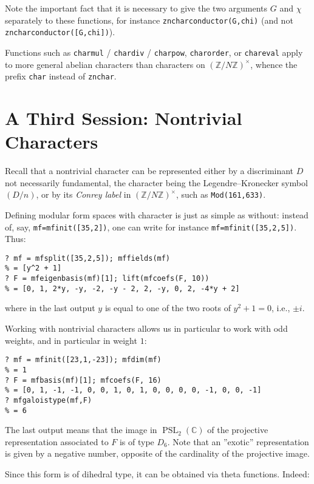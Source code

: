\documentclass[11pt]{article}
\DeclareMathOperator{\PSL}{PSL}
\newcommand{\Z}{{\mathbb Z}}
\newcommand{\C}{{\mathbb C}}
\def\kbd#1{{\tt #1}}
\begin{document}
Note the important fact that it is necessary to give the two arguments $G$ and
$\chi$ separately to these functions, for instance \kbd{zncharconductor(G,chi)}
(and not \kbd{zncharconductor([G,chi])}).

Functions such as \kbd{charmul} / \kbd{chardiv} / \kbd{charpow},
\kbd{charorder}, or \kbd{chareval} apply to more general abelian characters
than characters on $(\Z/N\Z)^\times$, whence the prefix \kbd{char} instead of
\kbd{znchar}.

\section{A Third Session: Nontrivial Characters}

Recall that a nontrivial character can be represented either by a discriminant
$D$ not necessarily fundamental, the character being the Legendre--Kronecker
symbol $(D/n)$, or by its \emph{Conrey label} in $(\Z/N\Z)^\times$, such as
\kbd{Mod(161,633)}.

Defining modular form spaces with character is just as simple as without:
instead of, say, \kbd{mf=mfinit([35,2])}, one can write for instance
\kbd{mf=mfinit([35,2,5])}. Thus:

\begin{verbatim}
? mf = mfsplit([35,2,5]); mffields(mf)
% = [y^2 + 1]
? F = mfeigenbasis(mf)[1]; lift(mfcoefs(F, 10))
% = [0, 1, 2*y, -y, -2, -y - 2, 2, -y, 0, 2, -4*y + 2]
\end{verbatim}

where in the last output $y$ is equal to one of the two roots of $y^2+1=0$,
i.e., $\pm i$.

Working with nontrivial characters allows us in particular to work with odd
weights, and in particular in weight $1$:

\begin{verbatim}
? mf = mfinit([23,1,-23]); mfdim(mf)
% = 1
? F = mfbasis(mf)[1]; mfcoefs(F, 16)
% = [0, 1, -1, -1, 0, 0, 1, 0, 1, 0, 0, 0, 0, -1, 0, 0, -1]
? mfgaloistype(mf,F)
% = 6
\end{verbatim}

The last output means that the image in $\PSL_2(\C)$ of the projective
representation associated to $F$ is of type $D_6$. Note that an ''exotic''
representation is given by a negative number, opposite of the cardinality
of the projective image.

Since this form is of dihedral type, it can be obtained via theta functions.
Indeed:
\end{document}
